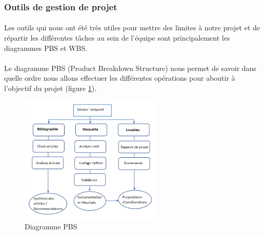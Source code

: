     \subsubsection{Outils de gestion de projet}
        \paragraph{}
        Les outils qui nous ont été très utiles pour mettre des limites à notre projet et de répartir les différentes tâches au sein de l'équipe sont principalement les diagrammes PBS et WBS.

        \paragraph{}
        Le diagramme PBS (Product Breakdown Structure) nous permet de savoir dans quelle ordre nous allons effectuer les différentes opérations pour aboutir à l'objectif du projet (figure \ref{PBS}).
        \begin{figure}
            \centering
            \includegraphics[width=0.6\textwidth]{images/pbs.png}
            \caption{Diagramme PBS}
            \label{PBS}
        \end{figure}


